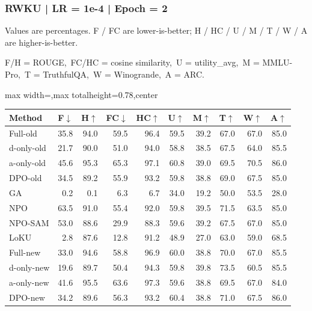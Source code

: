 \documentclass[aspectratio=169,11pt]{beamer}
\begin{document}
\begin{frame}[t]
\frametitle{RWKU | LR = 1e-4 | Epoch = 2}
{\tiny Values are percentages. F / FC are lower-is-better; H / HC / U / M / T / W / A are higher-is-better.}

{\tiny F/H = ROUGE,\ FC/HC = cosine similarity,\ U = utility\_avg,\ M = MMLU-Pro,\ T = TruthfulQA,\ W = Winogrande,\ A = ARC.}

\vspace{0.35em}
\centering
\scriptsize
\setlength{\tabcolsep}{3.6pt}
\renewcommand{\arraystretch}{1.05}
\begin{adjustbox}{max width=\textwidth,max totalheight=0.78\textheight,center}
\begin{tabular}{l*{9}{r}}
\toprule
Method & F$\downarrow$ & H$\uparrow$ & FC$\downarrow$ & HC$\uparrow$ & U$\uparrow$ & M$\uparrow$ & T$\uparrow$ & W$\uparrow$ & A$\uparrow$ \\
\midrule
\rowcolor{blue!10}
Full-old & 35.8 & 94.0 & 59.5 & 96.4 & 59.5 & 39.2 & 67.0 & 67.0 & 85.0 \\
\rowcolor{orange!10}
d-only-old & 21.7 & 90.0 & 51.0 & 94.0 & 58.8 & 38.5 & 67.5 & 64.0 & 85.5 \\
\rowcolor{green!10}
a-only-old & 45.6 & 95.3 & 65.3 & 97.1 & 60.8 & 39.0 & 69.5 & 70.5 & 86.0 \\
\rowcolor{gray!8}
DPO-old & 34.5 & 89.2 & 55.9 & 93.2 & 59.8 & 38.8 & 69.0 & 67.5 & 85.0 \\
\rowcolor{gray!8}
GA & 0.2 & 0.1 & 6.3 & 6.7 & 34.0 & 19.2 & 50.0 & 53.5 & 28.0 \\
\rowcolor{gray!8}
NPO & 63.5 & 91.0 & 55.4 & 92.0 & 59.8 & 39.5 & 71.5 & 63.5 & 85.0 \\
\rowcolor{gray!8}
NPO-SAM & 53.0 & 88.6 & 29.9 & 88.3 & 59.6 & 39.2 & 67.5 & 67.0 & 85.0 \\
\rowcolor{gray!8}
LoKU & 2.8 & 87.6 & 12.8 & 91.2 & 48.9 & 27.0 & 63.0 & 59.0 & 68.5 \\
\rowcolor{blue!20}
Full-new & 33.0 & 94.6 & 58.8 & 96.9 & 60.0 & 38.8 & 70.0 & 67.0 & 85.5 \\
\rowcolor{orange!20}
d-only-new & 19.6 & 89.7 & 50.4 & 94.3 & 59.8 & 39.8 & 73.5 & 60.5 & 85.5 \\
\rowcolor{green!20}
a-only-new & 41.6 & 95.5 & 63.6 & 97.3 & 59.6 & 38.8 & 69.5 & 67.0 & 84.0 \\
\rowcolor{gray!15}
DPO-new & 34.2 & 89.6 & 56.3 & 93.2 & 60.4 & 38.8 & 71.0 & 67.5 & 86.0 \\
\bottomrule
\end{tabular}
\end{adjustbox}
\end{frame}
\end{document}
